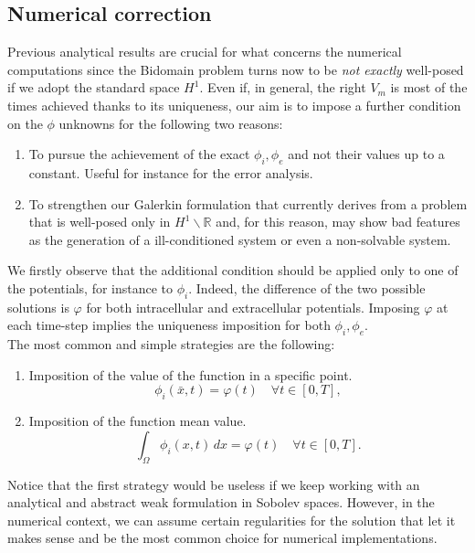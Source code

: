 \documentclass[a4paper,11pt]{article}
\begin{document}
\subsection{Numerical correction} \label{imposition_section}
Previous analytical results are crucial for what concerns the numerical computations since the Bidomain problem turns now to be \emph{not exactly} well-posed if we adopt the standard space $H^1$. Even if, in general, the right $V_m$ is most of the times achieved thanks to its uniqueness, our aim is to impose a further condition on the $\phi$ unknowns for the following two reasons:
\begin{enumerate}
	\item To pursue the achievement of the exact $\phi_i,\phi_e$ and not their values up to a constant. Useful for instance for the error analysis.
	\item To strengthen our Galerkin formulation that currently derives from a problem that is well-posed only in $H^1\backslash \mathbb{R}$ and, for this reason, may show bad features as the generation of a ill-conditioned system or even a non-solvable system.
\end{enumerate}

\vspace{3mm}
\noindent We firstly observe that the additional condition should be applied only to one of the potentials, for instance to $\phi_i$. Indeed, the difference of the two possible solutions is $\varphi$ for both intracellular and extracellular potentials. Imposing $\varphi$ at each time-step implies the uniqueness imposition for both $\phi_i,\phi_e$. \\

\noindent The most common and simple strategies are the following:
\begin{enumerate}
	\item Imposition of the value of the function in a specific point.
	\begin{equation*}
	\phi_i(\bar{x},t) = \varphi(t) \quad \forall t \in [0,T],
	\end{equation*}
	\item Imposition of the function mean value.
	\begin{equation*}
	\int_\Omega \phi_i(x,t)\,dx = \varphi(t) \quad \forall t \in [0,T].
	\end{equation*}
\end{enumerate}

\noindent Notice that the first strategy would be useless if we keep working with an analytical and abstract weak formulation in Sobolev spaces. However, in the numerical context, we can assume certain regularities for the solution that let it makes sense and be the most common choice for numerical implementations. \\
\end{document}
